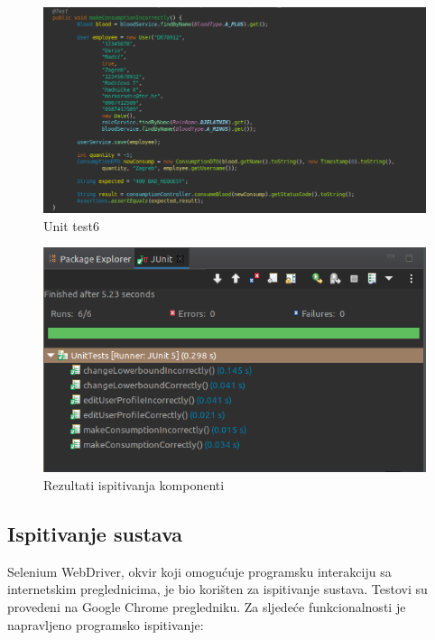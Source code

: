 \begin{figure}[H]
	\centering
	\includegraphics[width=\textwidth, scale=0.5]{slike/unit6}
	\caption{Unit test6}
\end{figure}

\begin{figure}[H]
	\centering
	\includegraphics[width=\textwidth, scale=0.5]{slike/unit_testing}
	\caption{Rezultati ispitivanja komponenti}
\end{figure}
\eject
			
			\subsection{Ispitivanje sustava}
			Selenium WebDriver, okvir koji omogućuje programsku interakciju sa internetskim preglednicima, je bio korišten za ispitivanje sustava. Testovi su provedeni na Google Chrome pregledniku. Za sljedeće funkcionalnosti je napravljeno programsko ispitivanje:
			
